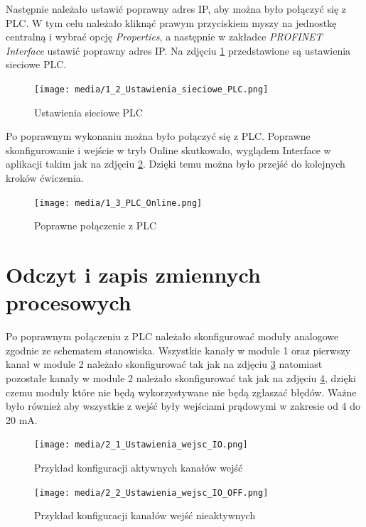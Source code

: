 \documentclass{article}
\begin{document}
Następnie należało ustawić poprawny adres IP, aby można było połączyć się z PLC. W tym celu należało kliknąć prawym przyciskiem myszy na jednostkę centralną i wybrać opcję \textit{Properties}, a następnie w zakładce \textit{PROFINET Interface} ustawić poprawny adres IP. Na zdjęciu \ref{fig:zdj2} przedstawione są ustawienia sieciowe PLC.
\begin{figure}[H]
    \centering
    \texttt{[image: media/1\_2\_Ustawienia\_sieciowe\_PLC.png]}
    \caption{Ustawienia sieciowe PLC}
    \label{fig:zdj2}
\end{figure}

Po poprawnym wykonaniu można było połączyć się z PLC. Poprawne skonfigurowanie i wejście w tryb Online skutkowało, wyglądem Interface w aplikacji takim jak na zdjęciu \ref{fig:zdj3}. Dzięki temu można było przejść do kolejnych kroków ćwiczenia.
\begin{figure}[H]
    \centering
    \texttt{[image: media/1\_3\_PLC\_Online.png]}
    \caption{Poprawne połączenie z PLC}
    \label{fig:zdj3}
\end{figure}


\newpage
\section{Odczyt i zapis zmiennych procesowych}
Po poprawnym połączeniu z PLC należało skonfigurować moduły analogowe zgodnie ze schematem stanowiska. Wszystkie kanały w module 1 oraz pierwszy kanał w module 2 należało skonfigurować tak jak na zdjęciu \ref{fig:zdj4} natomiast pozostałe kanały w module 2 należało skonfigurować tak jak na zdjęciu \ref{fig:zdj5}, dzięki czemu moduły które nie będą wykorzystywane nie będą zgłaszać błędów. Ważne było również aby wszystkie z wejść były wejściami prądowymi w zakresie od 4 do 20 mA.
\begin{figure}[H]
    \centering
    \texttt{[image: media/2\_1\_Ustawienia\_wejsc\_IO.png]}
    \caption{Przykład konfiguracji aktywnych kanałów wejść}
    \label{fig:zdj4}
\end{figure}

\begin{figure}[H]
    \centering
    \texttt{[image: media/2\_2\_Ustawienia\_wejsc\_IO\_OFF.png]}
    \caption{Przykład konfiguracji kanałów wejść nieaktywnych}
    \label{fig:zdj5}
\end{figure}
\end{document}
